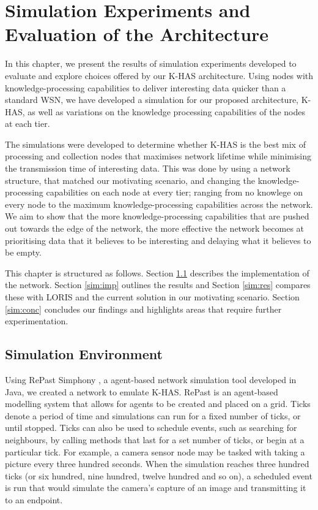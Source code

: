 \chapter{Simulation Experiments and Evaluation of the Architecture}
In this chapter, we present the results of simulation experiments developed to evaluate and explore choices offered by our K-HAS architecture. Using nodes with knowledge-processing capabilities to deliver interesting data quicker than a standard WSN, we have developed a simulation for our proposed architecture, K-HAS, as well as variations on the knowledge processing capabilities of the nodes at each tier.

The simulations were developed to determine whether K-HAS is the best mix of processing and collection nodes that maximises network lifetime while minimising the transmission time of interesting data. This was done by using a network structure, that matched our motivating scenario, and changing the knowledge-processing capabilities on each node at every tier; ranging from no knowlege on every node to the maximum knowledge-processing capabilities across the network. We aim to show that the more knowledge-processing capabilities that are pushed out towards the edge of the network, the more effective the network becomes at prioritising data that it believes to be interesting and delaying what it believes to be empty.

This chapter is structured as follows. Section \ref{sim:sim} describes the implementation of the network. Section \ref{sim:imp} outlines the results and Section \ref{sim:res} compares these with LORIS and the current solution in our motivating scenario. Section \ref{sim:conc} concludes our findings and highlights areas that require further experimentation.

\section{Simulation Environment}\label{sim:sim}

Using RePast Simphony \cite{Collier2003}, a agent-based network simulation tool developed in Java, we created a network to emulate K-HAS. RePast is an agent-based modelling system that allows for agents to be created and placed on a grid. Ticks denote a period of time and simulations can run for a fixed number of ticks, or until stopped. Ticks can also be used to schedule events, such as searching for neighbours, by calling methods that last for a set number of ticks, or begin at a particular tick. For example, a camera sensor node may be tasked with taking a picture every three hundred seconds. When the simulation reaches three hundred ticks (or six hundred, nine hundred, twelve hundred and so on), a scheduled event is run that would simulate the camera's capture of an image and transmitting it to an endpoint.

